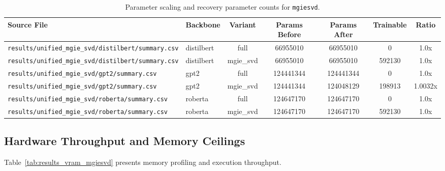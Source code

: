\begin{table}[t]
\centering
\small
\begin{tabular}{llccccc}
\toprule
\textbf{Source File} & \textbf{Backbone} & \textbf{Variant} & \textbf{Params Before} & \textbf{Params After} & \textbf{Trainable} & \textbf{Ratio} \\
\midrule
\texttt{results/unified\_mgie\_svd/distilbert/summary.csv} & distilbert & full & 66955010 & 66955010 & 0 & 1.0x \\
\texttt{results/unified\_mgie\_svd/distilbert/summary.csv} & distilbert & mgie\_svd & 66955010 & 66955010 & 592130 & 1.0x \\
\texttt{results/unified\_mgie\_svd/gpt2/summary.csv} & gpt2 & full & 124441344 & 124441344 & 0 & 1.0x \\
\texttt{results/unified\_mgie\_svd/gpt2/summary.csv} & gpt2 & mgie\_svd & 124441344 & 124048129 & 198913 & 1.0032x \\
\texttt{results/unified\_mgie\_svd/roberta/summary.csv} & roberta & full & 124647170 & 124647170 & 0 & 1.0x \\
\texttt{results/unified\_mgie\_svd/roberta/summary.csv} & roberta & mgie\_svd & 124647170 & 124647170 & 592130 & 1.0x \\
\bottomrule
\end{tabular}
\caption{Parameter scaling and recovery parameter counts for \texttt{mgiesvd}.}
\label{tab:results_params_mgiesvd}
\end{table}

\subsection{Hardware Throughput and Memory Ceilings}
Table~\ref{tab:results_vram_mgiesvd} presents memory profiling and execution throughput.

